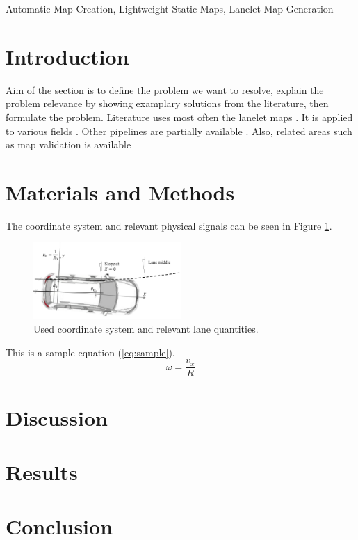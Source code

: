 \documentclass[conference]{IEEEtran}
\begin{document}
\begin{IEEEkeywords}
Automatic Map Creation, Lightweight Static Maps, Lanelet Map Generation
\end{IEEEkeywords}

\section{Introduction} \label{sec:introduction}
Aim of the section is to define the problem we want to resolve, explain the problem relevance by showing examplary solutions from the literature, then formulate the problem.
Literature uses most often the lanelet maps \cite{LaneletBasic}. It is applied to various fields \cite{laneletApplication}. Other pipelines are partially available \cite{PythonLanelet}. Also, related areas
such as map validation is available \cite{laneletValidation}

\section{Materials and Methods} \label{sec:matAndMeths}
The coordinate system and relevant physical signals can be seen in Figure \ref{fig:coordinateSystem}.
\begin{figure}[h]
    \centering
    \includegraphics[width=0.5\textwidth]{laneDataAndVehicle.png}
    \caption{Used coordinate system and relevant lane quantities.}
    \label{fig:coordinateSystem}
\end{figure}
This is a sample equation (\ref{eq:sample}).
\begin{equation} \label{eq:sample}
    \omega = \frac{v_x}{R}
\end{equation}

\section{Discussion} \label{sec:discussion}

\section{Results} \label{sec:results}

\section{Conclusion} \label{sec:conclusion}

 
\end{document}
